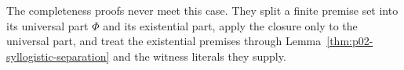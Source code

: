 The completeness proofs never meet this case. They split a finite premise
set into its universal part \(\Phi\) and its existential part, apply the
closure only to the universal part, and treat the existential premises
through Lemma~\ref{thm:p02-syllogistic-separation} and the witness
literals they supply.

